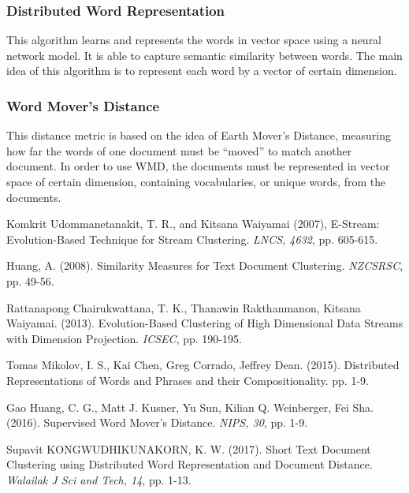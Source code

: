 \documentclass{IEEEtran}
\begin{document}
\subsubsection{Distributed Word Representation}
This algorithm learns and represents the words in vector space using a neural network model. It is able to capture semantic similarity between words. The main idea of this algorithm is to represent each word by a vector of certain dimension.

\subsubsection{Word Mover's Distance}
This distance metric is based on the idea of Earth Mover's Distance, measuring how far the words of one document must be ``moved'' to match another document. In order to use WMD, the documents must be represented in vector space of certain dimension, containing vocabularies, or unique words, from the documents.

\begin{thebibliography}{99}
 Komkrit Udommanetanakit, T. R., and Kitsana Waiyamai (2007), E-Stream: Evolution-Based Technique for Stream Clustering. {\it  LNCS, 4632},  pp. 605-615.

 Huang, A. (2008). Similarity Measures for Text Document Clustering. {\it NZCSRSC}, pp. 49-56. 
 
 Rattanapong Chairukwattana, T. K., Thanawin Rakthanmanon, Kitsana Waiyamai. (2013). Evolution-Based Clustering of High Dimensional Data Streams with Dimension Projection. {\it ICSEC}, pp. 190-195. 
  
 Tomas Mikolov, I. S., Kai Chen, Greg Corrado, Jeffrey Dean. (2015). Distributed Representations of Words and Phrases and their Compositionality. pp. 1-9.
  
 Gao Huang, C. G., Matt J. Kusner, Yu Sun, Kilian Q. Weinberger, Fei Sha. (2016). Supervised Word Mover's Distance. {\it NIPS, 30}, pp. 1-9. 
  
 Supavit KONGWUDHIKUNAKORN, K. W. (2017). Short Text Document Clustering using Distributed Word Representation and Document Distance. {\it  Walailak J Sci and Tech, 14}, pp. 1-13. 
    
\end{thebibliography}
\end{document}
